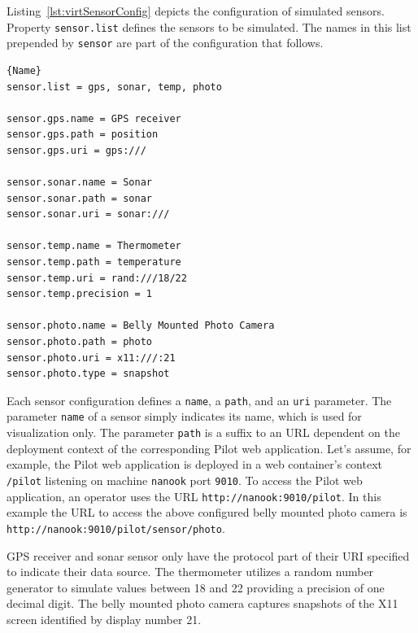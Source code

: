 Listing~\ref{lst:virtSensorConfig} depicts the configuration of simulated sensors. Property \texttt{sensor.list}
defines the sensors to be simulated. The names in this list prepended by \texttt{sensor} are part of the 
configuration that follows.
\lstset{tabsize=3,language=Tex}
\begin{lstlisting}[caption={Sensor Configuration Example},mathescape=true,label=lst:virtSensorConfig]{Name}
sensor.list = gps, sonar, temp, photo

sensor.gps.name = GPS receiver
sensor.gps.path = position
sensor.gps.uri = gps:///

sensor.sonar.name = Sonar
sensor.sonar.path = sonar
sensor.sonar.uri = sonar:///

sensor.temp.name = Thermometer
sensor.temp.path = temperature
sensor.temp.uri = rand:///18/22
sensor.temp.precision = 1

sensor.photo.name = Belly Mounted Photo Camera
sensor.photo.path = photo
sensor.photo.uri = x11:///:21
sensor.photo.type = snapshot
\end{lstlisting}
Each sensor configuration defines a \texttt{name}, a \texttt{path}, and an \texttt{uri} parameter.
The parameter \texttt{name} of a sensor simply indicates its name, which is used for visualization only.
The parameter \texttt{path} is a suffix to an \acs{URL} dependent on the deployment context of the corresponding
Pilot web application. Let's assume, for example, the Pilot web application is deployed in a
web container's context \texttt{/pilot} listening on machine \texttt{nanook} port \texttt{9010}.
To access the Pilot web application, an operator uses the \acs{URL} \texttt{http://nanook:9010/pilot}. In this
example the \acs{URL} to access the above configured belly mounted photo camera is
\texttt{http://nanook:9010/pilot/sensor/photo}. 

GPS receiver and sonar sensor only have the protocol part of their \acs{URI} specified to indicate their data source.
The thermometer utilizes a random number generator to simulate values between \unit{18}{\celsius} and
\unit{22}{\celsius} providing a precision of one decimal digit.  
The belly mounted photo camera captures snapshots of the X11 screen identified by display number 21.

